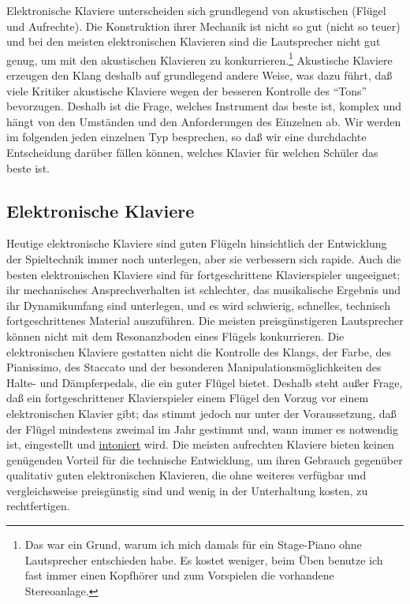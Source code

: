 Elektronische Klaviere unterscheiden sich grundlegend von akustischen (Flügel und Aufrechte).
Die Konstruktion ihrer Mechanik ist nicht so gut (nicht so teuer) und bei den meisten elektronischen Klavieren sind die Lautsprecher nicht gut genug, um mit den akustischen Klavieren zu konkurrieren.\footnote{Das war ein Grund, warum ich mich damals für ein Stage-Piano ohne Lautsprecher entschieden habe.
Es kostet weniger, beim Üben benutze ich fast immer einen Kopfhörer und zum Vorspielen die vorhandene Stereoanlage.}
Akustische Klaviere erzeugen den Klang deshalb auf grundlegend andere Weise, was dazu führt, daß viele Kritiker akustische Klaviere wegen der besseren Kontrolle des \enquote{Tons} bevorzugen.
Deshalb ist die Frage, welches Instrument das beste ist, komplex und hängt von den Umständen und den Anforderungen des Einzelnen ab.
Wir werden im folgenden jeden einzelnen Typ besprechen, so daß wir eine durchdachte Entscheidung darüber fällen können, welches Klavier für welchen Schüler das beste ist.

 
\subsection{Elektronische Klaviere}
\label{c1iii17b}

Heutige elektronische Klaviere sind guten Flügeln hinsichtlich der Entwicklung der Spieltechnik immer noch 
unterlegen, aber sie verbessern sich rapide.
Auch die besten elektronischen Klaviere sind für fortgeschrittene Klavierspieler ungeeignet; ihr mechanisches Ansprechverhalten ist schlechter, das musikalische Ergebnis und ihr Dynamikumfang sind unterlegen, und es wird schwierig, schnelles, technisch fortgeschrittenes Material auszuführen.
Die meisten preisgünstigeren Lautsprecher können nicht mit dem Resonanzboden eines Flügels konkurrieren.
Die elektronischen Klaviere gestatten nicht die Kontrolle des Klangs, der Farbe, des Pianissimo, des Staccato und der besonderen Manipulationsmöglichkeiten des Halte- und Dämpferpedals, die ein guter Flügel bietet.
Deshalb steht außer Frage, daß ein fortgeschrittener Klavierspieler einem Flügel den Vorzug vor einem elektronischen Klavier gibt; das stimmt jedoch nur unter der Voraussetzung, daß der Flügel mindestens zweimal im Jahr gestimmt und, wann immer es notwendig ist, eingestellt und \hyperref[c2_7_hamm]{intoniert} wird.
Die meisten aufrechten Klaviere bieten keinen genügenden Vorteil für die technische Entwicklung, um ihren Gebrauch gegenüber qualitativ guten elektronischen Klavieren, die ohne weiteres verfügbar und vergleichsweise preisgünstig sind und wenig in der Unterhaltung kosten, zu rechtfertigen.

